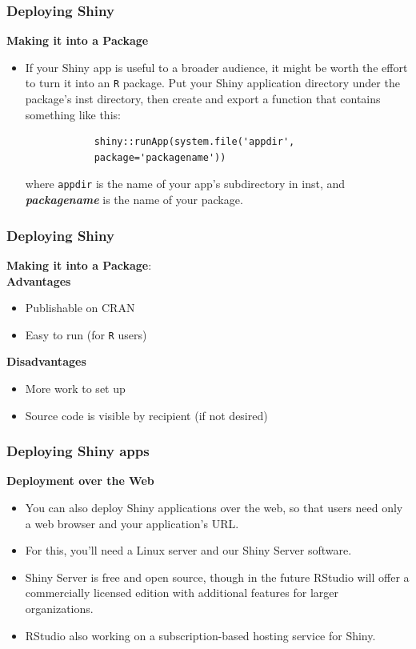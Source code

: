 \documentclass{beamer}
\begin{document}
\begin{frame}[fragile]
	\frametitle{Deploying Shiny}
	\textbf{Making it into a Package}
	\begin{itemize}
		\item If your Shiny app is useful to a broader audience, it might be worth the effort to turn it into an \texttt{R} package. Put your Shiny application directory under the package’s inst directory, then create and export a function that contains something like this:
		\begin{framed}
			\begin{verbatim}
			shiny::runApp(system.file('appdir', 
			package='packagename'))
			\end{verbatim}
		\end{framed}
		where \texttt{appdir} is the name of your app’s subdirectory in inst, and \textbf{\emph{packagename}} is the name of your package.
	\end{itemize}
\end{frame}

\begin{frame}
	\frametitle{Deploying Shiny}
	\textbf{Making it into a Package}:\\ \bigskip
	\textbf{Advantages} \begin{itemize}
		\item Publishable on CRAN
		\item Easy to run (for \texttt{R} users)
	\end{itemize} \textbf{Disadvantages} \begin{itemize}
	\item More work to set up
	\item Source code is visible by recipient (if not desired)
\end{itemize}
\end{frame}

\begin{frame}
	\frametitle{Deploying Shiny apps}
	\Large
	\textbf{Deployment over the Web}
	\begin{itemize}
		\item You can also deploy Shiny applications over the web, so that users need only a web browser and your application’s URL.
		\item For this, you’ll need a Linux server and our Shiny Server software. 
		\item Shiny Server is free and open source, though in the future RStudio will offer a commercially licensed edition with additional features for larger organizations.
		\item RStudio also working on a subscription-based hosting service for Shiny. 
	\end{itemize}
\end{frame}
\end{document}
